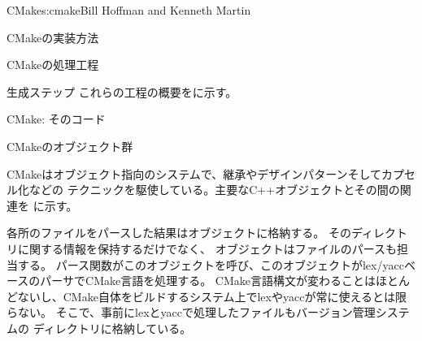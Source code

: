 \begin{aosachapter}{CMake}{s:cmake}{Bill Hoffman and Kenneth Martin}
\begin{aosasect1}{CMakeの実装方法}
\begin{aosasect2}{CMakeの処理工程}
\begin{aosasect3}{生成ステップ}
これらの工程の概要をに示す。


\end{aosasect3}

\end{aosasect2}

\begin{aosasect2}{CMake: そのコード}

\begin{aosasect3}{CMakeのオブジェクト群}

CMakeはオブジェクト指向のシステムで、継承やデザインパターンそしてカプセル化などの
テクニックを駆使している。主要なC++オブジェクトとその間の関連を
に示す。


各所のファイルをパースした結果はオブジェクトに格納する。
そのディレクトリに関する情報を保持するだけでなく、
オブジェクトはファイルのパースも担当する。
パース関数がこのオブジェクトを呼び、このオブジェクトがlex/yaccベースのパーサでCMake言語を処理する。
CMake言語構文が変わることはほとんどないし、CMake自体をビルドするシステム上でlexやyaccが常に使えるとは限らない。
そこで、事前にlexとyaccで処理したファイルもバージョン管理システムの
ディレクトリに格納している。


\end{aosasect3}
\end{aosasect2}
\end{aosasect1}
\end{aosachapter}
